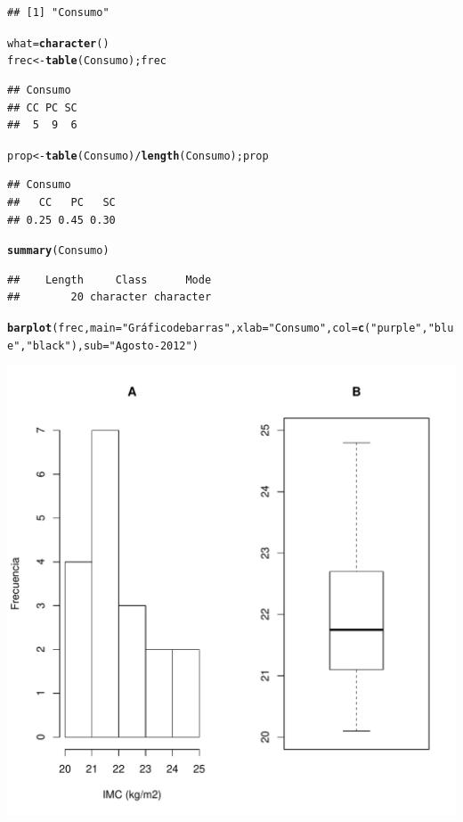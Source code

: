 \documentclass[10pt,a4paper]{article}\usepackage[]{graphicx}\usepackage[]{color}
\makeatletter
\def\maxwidth{ %
  \ifdim\Gin@nat@width>\linewidth
    \linewidth
  \else
    \Gin@nat@width
  \fi
}
\newcommand{\hlstr}[1]{\textcolor[rgb]{0.192,0.494,0.8}{#1}}%
\newcommand{\hlopt}[1]{\textcolor[rgb]{0,0,0}{#1}}%
\newcommand{\hlstd}[1]{\textcolor[rgb]{0.345,0.345,0.345}{#1}}%
\newcommand{\hlkwb}[1]{\textcolor[rgb]{0.69,0.353,0.396}{#1}}%
\newcommand{\hlkwc}[1]{\textcolor[rgb]{0.333,0.667,0.333}{#1}}%
\newcommand{\hlkwd}[1]{\textcolor[rgb]{0.737,0.353,0.396}{\textbf{#1}}}%
\newenvironment{kframe}{%
 \def\at@end@of@kframe{}%
 \ifinner\ifhmode%
  \def\at@end@of@kframe{\end{minipage}}%
  \begin{minipage}{\columnwidth}%
 \fi\fi%
 \def\FrameCommand##1{\hskip\@totalleftmargin \hskip-\fboxsep
 \colorbox{shadecolor}{##1}\hskip-\fboxsep
     \hskip-\linewidth \hskip-\@totalleftmargin \hskip\columnwidth}%
 \MakeFramed {\advance\hsize-\width
   \@totalleftmargin\z@ \linewidth\hsize
   \@setminipage}}%
 {\par\unskip\endMakeFramed%
 \at@end@of@kframe}
\newenvironment{knitrout}{}{} %
\makeatother
\begin{document}
\begin{knitrout}
\begin{kframe}
\begin{verbatim}
## [1] "Consumo"
\end{verbatim}
\begin{alltt}
\hlstd{what} \hlkwb{=} \hlkwd{character}\hlstd{()}
\hlstd{frec} \hlkwb{<-} \hlkwd{table}\hlstd{(Consumo); frec}
\end{alltt}
\begin{verbatim}
## Consumo
## CC PC SC 
##  5  9  6
\end{verbatim}
\begin{alltt}
\hlstd{prop} \hlkwb{<-} \hlkwd{table}\hlstd{(Consumo)}\hlopt{/}\hlkwd{length}\hlstd{(Consumo); prop}
\end{alltt}
\begin{verbatim}
## Consumo
##   CC   PC   SC 
## 0.25 0.45 0.30
\end{verbatim}
\begin{alltt}
\hlkwd{summary}\hlstd{(Consumo)}
\end{alltt}
\begin{verbatim}
##    Length     Class      Mode 
##        20 character character
\end{verbatim}
\begin{alltt}
\hlkwd{barplot}\hlstd{(frec,} \hlkwc{main}\hlstd{=}\hlstr{"Gráfico de barras"}\hlstd{,} \hlkwc{xlab}\hlstd{=}\hlstr{" Consumo"}\hlstd{,} \hlkwc{col}\hlstd{=}\hlkwd{c}\hlstd{(}\hlstr{"purple"}\hlstd{,} \hlstr{"blue"}\hlstd{,} \hlstr{"black"}\hlstd{),} \hlkwc{sub}\hlstd{=}\hlstr{"Agosto-2012"}\hlstd{)}
\end{alltt}
\end{kframe}
\includegraphics[width=\maxwidth]{figure/unnamed-chunk-1-1} 

\end{knitrout}
\end{document}

